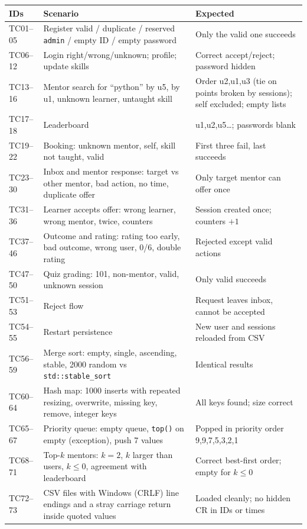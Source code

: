 \documentclass[11pt,a4paper]{article}
\begin{document}
\begin{center}\small
\begin{tabular}{p{2cm}p{6.4cm}p{5cm}}\toprule
IDs & Scenario & Expected\\\midrule
TC01--05 & Register valid / duplicate / reserved \texttt{admin} / empty ID / empty password & Only the valid one succeeds\\
TC06--12 & Login right/wrong/unknown; profile; update skills & Correct accept/reject; password hidden\\
TC13--16 & Mentor search for ``python'' by u5, by u1, unknown learner, untaught skill & Order u2,u1,u3 (tie on points broken by sessions); self excluded; empty lists\\
TC17--18 & Leaderboard & u1,u2,u5\ldots; passwords blank\\
TC19--22 & Booking: unknown mentor, self, skill not taught, valid & First three fail, last succeeds\\
TC23--30 & Inbox and mentor response: target vs other mentor, bad action, no time, duplicate offer & Only target mentor can offer once\\
TC31--36 & Learner accepts offer: wrong learner, wrong mentor, twice, counters & Session created once; counters $+1$\\
TC37--46 & Outcome and rating: rating too early, bad outcome, wrong user, 0/6, double rating & Rejected except valid actions\\
TC47--50 & Quiz grading: 101, non-mentor, valid, unknown session & Only valid succeeds\\
TC51--53 & Reject flow & Request leaves inbox, cannot be accepted\\
TC54--55 & Restart persistence & New user and sessions reloaded from CSV\\
TC56--59 & Merge sort: empty, single, ascending, stable, 2000 random vs \texttt{std::stable\_sort} & Identical results\\
TC60--64 & Hash map: 1000 inserts with repeated resizing, overwrite, missing key, remove, integer keys & All keys found; size correct\\
TC65--67 & Priority queue: empty queue, \texttt{top()} on empty (exception), push 7 values & Popped in priority order 9,9,7,5,3,2,1\\
TC68--71 & Top-$k$ mentors: $k=2$, $k$ larger than users, $k\le0$, agreement with leaderboard & Correct best-first order; empty for $k\le0$\\
TC72--73 & CSV files with Windows (CRLF) line endings and a stray carriage return inside quoted values & Loaded cleanly; no hidden CR in IDs or times\\
\bottomrule
\end{tabular}
\end{center}
\end{document}
